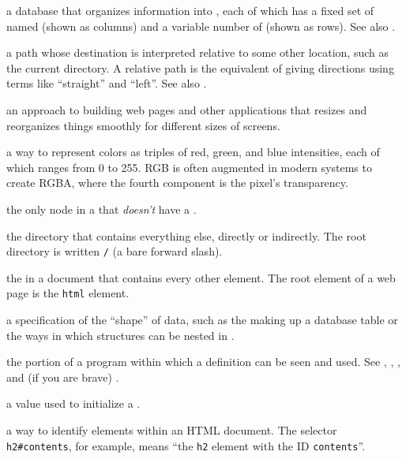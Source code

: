 \begin{description}
a database that organizes information into , each of which
has a fixed set of named  (shown as columns) and a variable
number of  (shown as rows). See also .

a path whose destination is interpreted relative to some other location, such
as the current directory. A relative path is the equivalent of giving
directions using terms like ``straight'' and ``left''. See also .

an approach to building web pages and other applications that resizes and
reorganizes things smoothly for different sizes of screens.

a way to represent colors as triples of red, green, and blue intensities, each
of which ranges from 0 to 255. RGB is often augmented in modern systems to
create RGBA, where the fourth component is the pixel's transparency.

the only node in a  that \emph{doesn't} have a .

the directory that contains everything else, directly or indirectly. The root
directory is written \texttt{/} (a bare forward slash).

the  in a document that contains every other element.
The root element of a web page is the \texttt{html} element.

a specification of the ``shape'' of data, such as the  making
up a database table or the ways in which structures can be nested in
.

the portion of a program within which a definition can be seen and used. See
, ,
, and (if you are brave)
.

a value used to initialize a .

a way to identify elements within an HTML document. The selector
\texttt{h2\#contents}, for example, means ``the \texttt{h2} element with the ID \texttt{contents}''.


\end{description}
